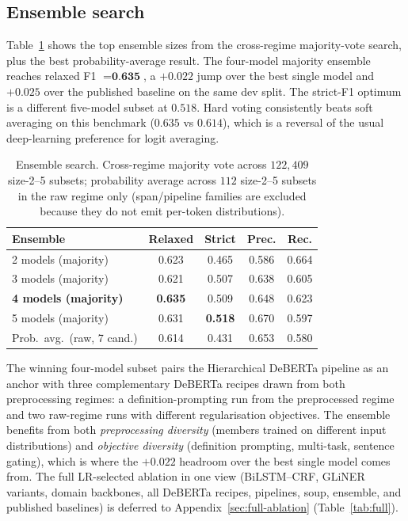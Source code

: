 \documentclass[11pt]{article}
\begin{document}
\subsection{Ensemble search}

Table~\ref{tab:ensemble} shows the top ensemble sizes from the
cross-regime majority-vote search, plus the best probability-average
result. The four-model majority ensemble reaches relaxed F1 $=
\textbf{0.635}$, a $+0.022$ jump over the best single model and $+0.025$
over the published baseline on the same dev split. The strict-F1
optimum is a different five-model subset at $0.518$. Hard voting
consistently beats soft averaging on this benchmark ($0.635$ vs
$0.614$), which is a reversal of the usual deep-learning preference for
logit averaging.

\begin{table}[t]
\centering\scriptsize
\setlength{\tabcolsep}{4pt}
\begin{tabular}{lcccc}
\toprule
Ensemble & Relaxed & Strict & Prec. & Rec. \\
\midrule
2 models (majority)              & 0.623 & 0.465 & 0.586 & 0.664 \\
3 models (majority)              & 0.621 & 0.507 & 0.638 & 0.605 \\
\textbf{4 models (majority)}     & \textbf{0.635} & 0.509 & 0.648 & 0.623 \\
5 models (majority)              & 0.631 & \textbf{0.518} & 0.670 & 0.597 \\
\midrule
Prob.\ avg.\ (raw, 7 cand.)      & 0.614 & 0.431 & 0.653 & 0.580 \\
\bottomrule
\end{tabular}
\caption{Ensemble search. Cross-regime majority vote across $122{,}409$
size-2--5 subsets; probability average across $112$ size-2--5 subsets in
the raw regime only (span/pipeline families are excluded because they
do not emit per-token distributions).}
\label{tab:ensemble}
\end{table}

The winning four-model subset pairs the Hierarchical DeBERTa pipeline
as an anchor with three complementary DeBERTa recipes drawn from both
preprocessing regimes: a definition-prompting run from the
preprocessed regime and two raw-regime runs with different
regularisation objectives. The ensemble benefits from both
\emph{preprocessing diversity} (members trained on different input
distributions) and \emph{objective diversity} (definition prompting,
multi-task, sentence gating), which is where the $+0.022$ headroom
over the best single model comes from. The full LR-selected ablation
in one view (BiLSTM--CRF, GLiNER variants, domain backbones, all
DeBERTa recipes, pipelines, soup, ensemble, and published baselines)
is deferred to Appendix~\ref{sec:full-ablation} (Table~\ref{tab:full}).
\end{document}
